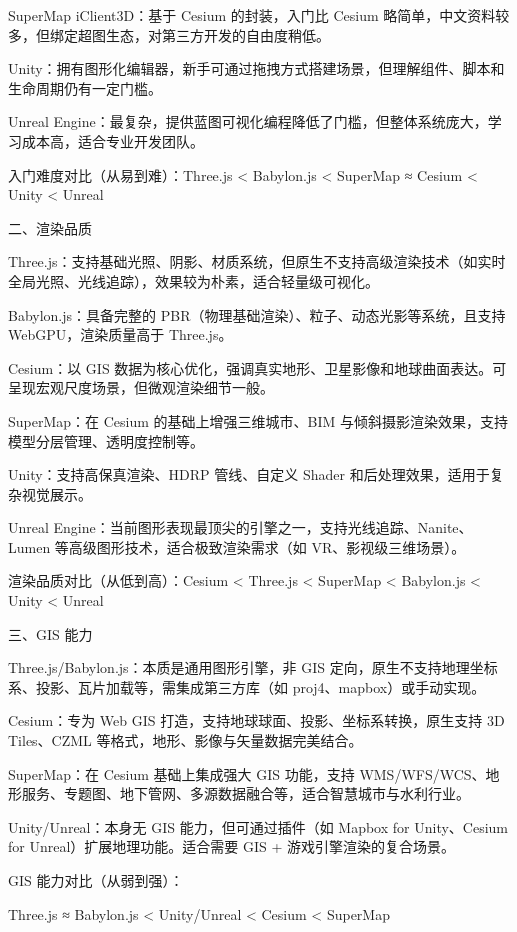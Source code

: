 SuperMap iClient3D：基于 Cesium 的封装，入门比 Cesium 略简单，中文资料较多，但绑定超图生态，对第三方开发的自由度稍低。

Unity：拥有图形化编辑器，新手可通过拖拽方式搭建场景，但理解组件、脚本和生命周期仍有一定门槛。

Unreal Engine：最复杂，提供蓝图可视化编程降低了门槛，但整体系统庞大，学习成本高，适合专业开发团队。

入门难度对比（从易到难）：Three.js \textless{} Babylon.js \textless{} SuperMap ≈ Cesium \textless{} Unity \textless{} Unreal

二、渲染品质

Three.js：支持基础光照、阴影、材质系统，但原生不支持高级渲染技术（如实时全局光照、光线追踪），效果较为朴素，适合轻量级可视化。

Babylon.js：具备完整的 PBR（物理基础渲染）、粒子、动态光影等系统，且支持 WebGPU，渲染质量高于 Three.js。

Cesium：以 GIS 数据为核心优化，强调真实地形、卫星影像和地球曲面表达。可呈现宏观尺度场景，但微观渲染细节一般。

SuperMap：在 Cesium 的基础上增强三维城市、BIM 与倾斜摄影渲染效果，支持模型分层管理、透明度控制等。

Unity：支持高保真渲染、HDRP 管线、自定义 Shader 和后处理效果，适用于复杂视觉展示。

Unreal Engine：当前图形表现最顶尖的引擎之一，支持光线追踪、Nanite、Lumen 等高级图形技术，适合极致渲染需求（如 VR、影视级三维场景）。

渲染品质对比（从低到高）：Cesium \textless{} Three.js \textless{} SuperMap \textless{} Babylon.js \textless{} Unity \textless{} Unreal

三、GIS 能力

Three.js/Babylon.js：本质是通用图形引擎，非 GIS 定向，原生不支持地理坐标系、投影、瓦片加载等，需集成第三方库（如 proj4、mapbox）或手动实现。

Cesium：专为 Web GIS 打造，支持地球球面、投影、坐标系转换，原生支持 3D Tiles、CZML 等格式，地形、影像与矢量数据完美结合。

SuperMap：在 Cesium 基础上集成强大 GIS 功能，支持 WMS/WFS/WCS、地形服务、专题图、地下管网、多源数据融合等，适合智慧城市与水利行业。

Unity/Unreal：本身无 GIS 能力，但可通过插件（如 Mapbox for Unity、Cesium for Unreal）扩展地理功能。适合需要 GIS + 游戏引擎渲染的复合场景。

GIS 能力对比（从弱到强）：

Three.js ≈ Babylon.js \textless{} Unity/Unreal \textless{} Cesium \textless{} SuperMap

